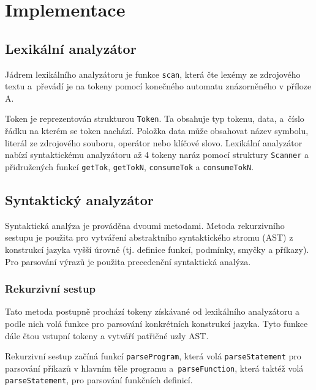 \documentclass[12pt,a4paper,titlepage,final]{article}
\begin{document}
\section{Implementace} \label{implementace}
\subsection{Lexikální analyzátor}
Jádrem lexikálního analyzátoru je funkce \texttt{scan}, která čte lexémy ze zdrojového 
textu a~převádí je na tokeny pomocí konečného automatu znázorněného v příloze A.

Token je reprezentován strukturou \texttt{Token}. Ta obsahuje typ tokenu, data, a~číslo 
řádku na kterém se token nachází. Položka data může obsahovat název symbolu, literál ze 
zdrojového souboru, operátor nebo klíčové slovo. Lexikální analyzátor nabízí syntaktickému 
analyzátoru až 4 tokeny naráz pomocí struktury \texttt{Scanner} a přidružených funkcí
\texttt{getTok}, \texttt{getTokN}, \texttt{consumeTok} a \texttt{consumeTokN}.
\subsection{Syntaktický analyzátor}
Syntaktická analýza je prováděna dvoumi metodami. Metoda rekurzivního 
sestupu je použita pro vytváření abstraktního syntaktického stromu (AST)
z konstrukcí jazyka vyšší úrovně (tj. definice funkcí, podmínky, smyčky
a příkazy). Pro parsování výrazů je použita precedenční syntaktická 
analýza.

\subsubsection{Rekurzivní sestup}
Tato metoda postupně prochází tokeny získávané od lexikálního analyzátoru
a podle nich volá funkce pro parsování konkrétních konstrukcí jazyka.
Tyto funkce dále čtou vstupní tokeny a vytváří patřičné uzly AST.

Rekurzivní sestup začíná funkcí \texttt{parseProgram}, která volá
\texttt{parseStatement} pro parsování příkazů v hlavním těle programu
a~\texttt{parseFunction}, která taktéž volá \texttt{parseStatement},
pro parsování funkčních definicí.
\end{document}
